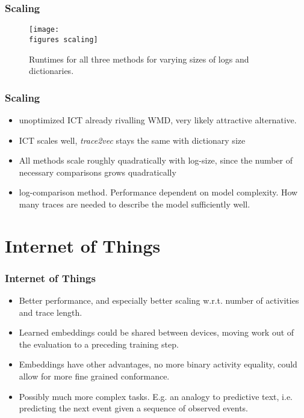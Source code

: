 \documentclass{beamer}
\newcommand{\figures}{../figures/}
\begin{document}
	
	\begin{frame}
		\frametitle{Scaling}
		\begin{figure}
			\texttt{[image: \\figures scaling]}
			\caption{Runtimes for all three methods for varying sizes of logs and dictionaries.}
			\label{fig:scalability}
		\end{figure}
	\end{frame}
	
	
	\begin{frame}
		\frametitle{Scaling}
		\begin{itemize}
			\item unoptimized ICT already rivalling WMD, very likely attractive alternative.
			\item ICT scales well, \emph{trace2vec} stays the same with dictionary size
			\item All methods scale roughly quadratically with log-size, since the number of necessary comparisons grows quadratically
			\item log-comparison method. Performance dependent on model complexity. How many traces are needed to describe the model sufficiently well.
		\end{itemize}
	\end{frame}
	
	\section{Internet of Things}
	\begin{frame}
		\frametitle{Internet of Things}
		\begin{itemize}
			\item Better performance, and especially better scaling w.r.t. number of activities and trace length.
			\item Learned embeddings could be shared between devices, moving work out of the evaluation to a preceding training step.
			\item Embeddings have other advantages, no more binary activity equality, could allow for more fine grained conformance.
			\item Possibly much more complex tasks. E.g. an analogy to predictive text, i.e. predicting the next event given a sequence of observed events.
		\end{itemize}
	\end{frame}
	
\end{document}
